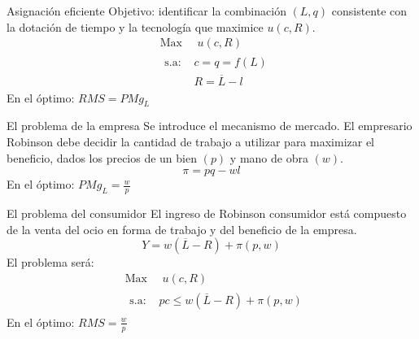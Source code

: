 \begin{frame}{Asignación eficiente}
	Objetivo: identificar la combinación $(L,q)$ consistente con la dotación de tiempo y la tecnología que maximice $u(c,R)$.
		\begin{align*}
			& \text{Max } \quad u\left(c,R\right) \\
			& \begin{array}{ll}
				\text{s.a: } & c = q = f(L) \\[0.1cm]
							 & R = \overline{L}- l
			\end{array}
		\end{align*}
	En el óptimo: $RMS = PMg_L$\\
		\begin{center}
			
		\end{center}
\end{frame}
\begin{frame}{El problema de la empresa}
	Se introduce el mecanismo de mercado. El empresario Robinson debe decidir la cantidad de trabajo a utilizar para maximizar el beneficio, dados los precios de un bien $(p)$ y mano de obra $(w)$.
			\medskip
		$$\pi = pq - wl$$
			\medskip
	En el óptimo: $PMg_L=\frac{w}{p}$\\
			\vspace{-0.3cm}
		\begin{center}
			
		\end{center}
\end{frame}
\begin{frame}{El problema del consumidor}
	El ingreso de Robinson consumidor está compuesto de la venta del ocio en forma de trabajo y del beneficio de la empresa.
	$$Y = w(\overline{L}-R)+\pi(p,w)$$
	El problema será:
		\begin{align*}
			& \text{Max } \quad u\left(c,R\right) \\
			& \begin{array}{ll}
				\text{s.a: } & pc \leq w(\overline{L}-R)+\pi(p,w)
			  \end{array}
		\end{align*}
	En el óptimo: $RMS=\frac{w}{p}$\\
			\vspace{2.4cm}
		\begin{center}
			\hspace{-9cm} 
		\end{center}
\end{frame}
